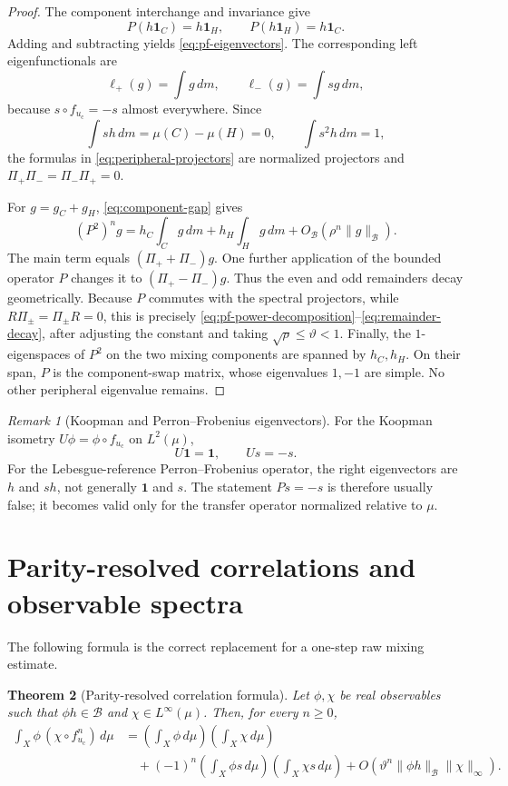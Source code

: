 \documentclass[11pt]{article}
\newtheorem{theorem}{Theorem}[section]
\theoremstyle{definition}
\theoremstyle{remark}
\newtheorem{remark}[theorem]{Remark}
\newcommand{\uc}{u_{\mathrm c}}
\newcommand{\cB}{\mathcal B}
\newcommand{\one}{\mathbf 1}
\begin{document}
\begin{proof}
The component interchange and invariance give
\[
    P(h\one_C)=h\one_H,
    \qquad P(h\one_H)=h\one_C.
\]
Adding and subtracting yields \eqref{eq:pf-eigenvectors}.  The corresponding left eigenfunctionals are
\[
    \ell_+(g)=\int g\,dm,
    \qquad
    \ell_-(g)=\int sg\,dm,
\]
because $s\circ f_{\uc}=-s$ almost everywhere.  Since
\[
    \int sh\,dm=\mu(C)-\mu(H)=0,
    \qquad
    \int s^2h\,dm=1,
\]
the formulas in \eqref{eq:peripheral-projectors} are normalized projectors and $\Pi_+\Pi_-=\Pi_-\Pi_+=0$.

For $g=g_C+g_H$, \eqref{eq:component-gap} gives
\[
    (P^2)^ng
    =h_C\int_Cg\,dm+h_H\int_Hg\,dm
      +O_{\cB}(\rho^n\|g\|_{\cB}).
\]
The main term equals $(\Pi_++\Pi_-)g$.  One further application of the bounded operator $P$ changes it to $(\Pi_+-\Pi_-)g$.  Thus the even and odd remainders decay geometrically.  Because $P$ commutes with the spectral projectors, while $R\Pi_\pm=\Pi_\pm R=0$, this is precisely \eqref{eq:pf-power-decomposition}--\eqref{eq:remainder-decay}, after adjusting the constant and taking $\sqrt\rho\le\vartheta<1$.  Finally, the $1$-eigenspaces of $P^2$ on the two mixing components are spanned by $h_C,h_H$.  On their span, $P$ is the component-swap matrix, whose eigenvalues $1,-1$ are simple.  No other peripheral eigenvalue remains.
\end{proof}

\begin{remark}[Koopman and Perron--Frobenius eigenvectors]\label{rem:koopman-pf}
For the Koopman isometry $U\phi=\phi\circ f_{\uc}$ on $L^2(\mu)$,
\[
    U\one=\one,
    \qquad Us=-s.
\]
For the Lebesgue-reference Perron--Frobenius operator, the right eigenvectors are $h$ and $sh$, not generally $\one$ and $s$.  The statement $Ps=-s$ is therefore usually false; it becomes valid only for the transfer operator normalized relative to $\mu$.
\end{remark}

\section{Parity-resolved correlations and observable spectra}

The following formula is the correct replacement for a one-step raw mixing estimate.

\begin{theorem}[Parity-resolved correlation formula]\label{thm:parity-correlation}
Let $\phi,\chi$ be real observables such that $\phi h\in\cB$ and $\chi\in L^\infty(\mu)$.  Then, for every $n\ge0$,
\begin{equation}\label{eq:two-mode-correlation}
\begin{split}
    \int_X\phi\,(\chi\circ f_{\uc}^n)\,d\mu
    &={\left(\int_X\phi\,d\mu\right)}
      {\left(\int_X\chi\,d\mu\right)}\\
    &\quad+(-1)^n
      {\left(\int_X\phi s\,d\mu\right)}
      {\left(\int_X\chi s\,d\mu\right)}
      +O\!\left(\vartheta^n
        \|\phi h\|_{\cB}\|\chi\|_\infty\right).
\end{split}
\end{equation}
\end{theorem}
\end{document}
